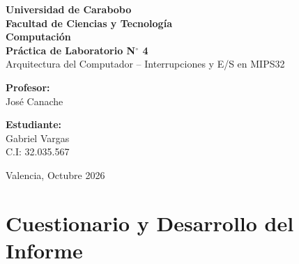 \documentclass[12pt,a4paper]{article}
\begin{document}
\begin{titlepage}
    \centering
    \vspace*{1.5cm}
    
    {\Large \textbf{Universidad de Carabobo}} \\[0.3cm]
    {\Large \textbf{Facultad de Ciencias y Tecnología}} \\[0.3cm]
    {\Large \textbf{Computación}} \\[3.5cm]
    
    {\LARGE \textbf{Práctica de Laboratorio N$^\circ$ 4}} \\[0.5cm]
    {\Large Arquitectura del Computador -- Interrupciones y E/S en MIPS32} \\[4cm]
    
    \begin{minipage}[t]{0.45\textwidth}
        \begin{flushleft} \large
            \textbf{Profesor:}\\
            José Canache
        \end{flushleft}
    \end{minipage}
    \hfill
    \begin{minipage}[t]{0.45\textwidth}
        \begin{flushright} \large
            \textbf{Estudiante:} \\
            Gabriel Vargas \\
            C.I: 32.035.567
        \end{flushright}
    \end{minipage}
    
    \vfill
    
    {\large Valencia, Octubre 2026}
\end{titlepage}

\newpage

\section*{Cuestionario y Desarrollo del Informe}
\end{document}

